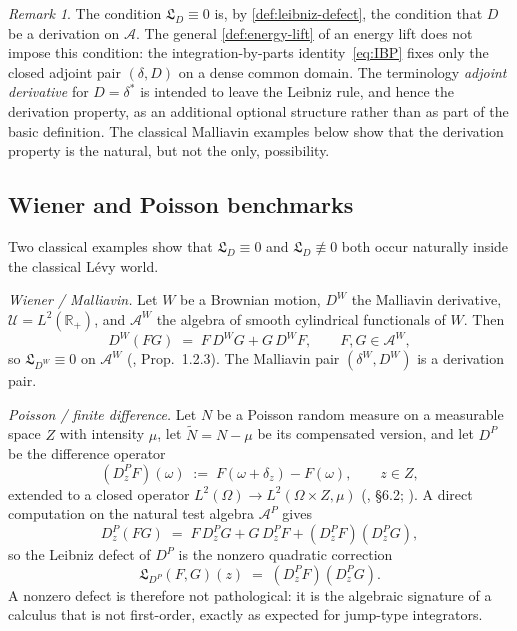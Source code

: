 \documentclass[11pt,reqno]{amsart}
\theoremstyle{plain}
\theoremstyle{definition}
\theoremstyle{remark}
\newtheorem{remark}[theorem]{Remark}
\newcommand{\R}{\mathbb{R}}
\begin{document}
\begin{remark}\label{rem:why-adjoint-derivative}
The condition $\mathfrak L_D\equiv 0$ is, by
\cref{def:leibniz-defect}, the condition that $D$ be a derivation
on $\mathcal A$. The general \cref{def:energy-lift} of an energy
lift does not impose this condition: the integration-by-parts
identity~\eqref{eq:IBP} fixes only the closed adjoint pair
$(\delta,D)$ on a dense common domain. The terminology
\emph{adjoint derivative} for $D=\delta^{*}$ is intended to leave
the Leibniz rule, and hence the derivation property, as an
additional optional structure rather than as part of the basic
definition. The classical Malliavin examples below show that the
derivation property is the natural, but not the only, possibility.
\end{remark}

\subsection{Wiener and Poisson benchmarks}\label{sec:leibniz-benchmarks}

Two classical examples show that $\mathfrak L_D\equiv 0$ and
$\mathfrak L_D\not\equiv 0$ both occur naturally inside the
classical L\'evy world.

\emph{Wiener / Malliavin.} Let $W$ be a Brownian motion, $D^W$ the
Malliavin derivative, $\mathcal U=L^2(\R_+)$, and $\mathcal A^W$ the
algebra of smooth cylindrical functionals of $W$. Then
\begin{equation}\label{eq:leibniz-wiener}
  D^W(FG)\;=\;F\,D^W G+G\,D^W F,\qquad F,G\in\mathcal A^W,
\end{equation}
so $\mathfrak L_{D^W}\equiv 0$ on $\mathcal A^W$
(\cite{Nualart}, Prop.~1.2.3). The Malliavin pair $(\delta^W,D^W)$
is a derivation pair.

\emph{Poisson / finite difference.} Let $N$ be a Poisson random
measure on a measurable space $Z$ with intensity $\mu$, let
$\widetilde N=N-\mu$ be its compensated version, and let $D^P$ be the
difference operator
\[
  (D^P_z F)(\omega)\;:=\;F(\omega+\delta_z)-F(\omega),\qquad z\in Z,
\]
extended to a closed operator
$L^2(\Omega)\to L^2(\Omega\times Z,\mu)$ (\cite{Nualart}, \S 6.2;
\cite{LastPenrose}). A direct computation on the natural test algebra
$\mathcal A^P$ gives
\begin{equation}\label{eq:leibniz-poisson}
  D^P_z(FG)
  \;=\;F\,D^P_z G+G\,D^P_z F+(D^P_z F)(D^P_z G),
\end{equation}
so the Leibniz defect of $D^P$ is the nonzero quadratic correction
\begin{equation}\label{eq:leibniz-defect-poisson}
  \mathfrak L_{D^P}(F,G)(z)\;=\;(D^P_z F)(D^P_z G).
\end{equation}
A nonzero defect is therefore not pathological: it is the algebraic
signature of a calculus that is not first-order, exactly as expected
for jump-type integrators.
\end{document}

